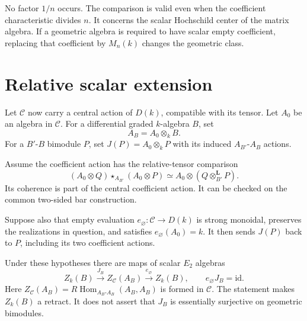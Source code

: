 No factor $1/n$ occurs. The comparison is valid even
when the coefficient characteristic divides $n$.
It concerns the scalar Hochschild center of the
matrix algebra. If a geometric algebra is required
to have scalar empty coefficient, replacing that
coefficient by $M_n(k)$ changes the geometric class.

\section{Relative scalar extension}
\label{v4-arith:centers:sec:relative}

Let $\mathcal C$ now carry a central action of
$D(k)$, compatible with its tensor. Let $A_0$ be an
algebra in $\mathcal C$. For a differential graded
$k$-algebra $B$, set
\[
 A_B=A_0\otimes_k B.
\]
For a $B'$-$B$ bimodule $P$, set
$J(P)=A_0\otimes_k P$ with its induced
$A_{B'}$-$A_B$ actions.

Assume the coefficient action has the relative-tensor
comparison
\begin{equation}\label{v4-arith:centers:eq:relative-tensor}
 (A_0\otimes Q)\star_{A_{B'}}
 (A_0\otimes P)
 \simeq A_0\otimes(Q\otimes_{B'}^{\mathbf L}P).
\end{equation}
Its coherence is part of the central coefficient
action. It can be checked on the common two-sided
bar construction.

Suppose also that empty evaluation
$e_\varnothing:\mathcal C\to D(k)$ is strong monoidal,
preserves the realizations in question, and satisfies
$e_\varnothing(A_0)=k$. It then sends $J(P)$ back to
$P$, including its two coefficient actions.

\begin{theorem}
\label{v4-arith:centers:thm:relative-retract}
Under these hypotheses there are maps of scalar
$E_2$ algebras
\begin{equation}\label{v4-arith:centers:eq:retract}
 Z_k(B)\xrightarrow{J_B}Z_{\mathcal C}(A_B)
 \xrightarrow{e_\varnothing}Z_k(B),
 \qquad e_\varnothing J_B=\mathrm{id}.
\end{equation}
Here
$Z_{\mathcal C}(A_B)=
R\operatorname{Hom}_{A_B\text{-}A_B}(A_B,A_B)$
is formed in $\mathcal C$. The statement makes
$Z_k(B)$ a retract. It does not assert that $J_B$
is essentially surjective on geometric bimodules.
\end{theorem}

